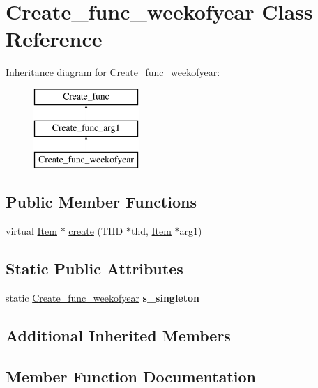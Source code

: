 \hypertarget{classCreate__func__weekofyear}{}\section{Create\+\_\+func\+\_\+weekofyear Class Reference}
\label{classCreate__func__weekofyear}
Inheritance diagram for Create\+\_\+func\+\_\+weekofyear\+:\begin{figure}[H]
\begin{center}
\leavevmode
\includegraphics[height=3.000000cm]{classCreate__func__weekofyear}
\end{center}
\end{figure}
\subsection*{Public Member Functions}
\begin{DoxyCompactItemize}
\item 
virtual \mbox{\hyperlink{classItem}{Item}} $\ast$ \mbox{\hyperlink{classCreate__func__weekofyear_ad2d7508505a1e2a061703a167ef2fb65}{create}} (T\+HD $\ast$thd, \mbox{\hyperlink{classItem}{Item}} $\ast$arg1)
\end{DoxyCompactItemize}
\subsection*{Static Public Attributes}
\begin{DoxyCompactItemize}
\item 
\mbox{\label{classCreate__func__weekofyear_a7bd6c4fa3f2331d1f027ec80bfee3dc6}} 
static \mbox{\hyperlink{classCreate__func__weekofyear}{Create\+\_\+func\+\_\+weekofyear}} {\bfseries s\+\_\+singleton}
\end{DoxyCompactItemize}
\subsection*{Additional Inherited Members}


\subsection{Member Function Documentation}
\mbox{\label{classCreate__func__weekofyear_ad2d7508505a1e2a061703a167ef2fb65}} 
